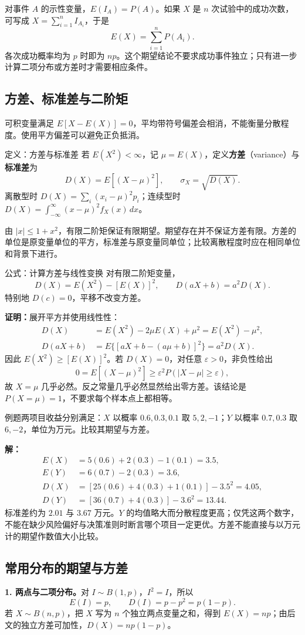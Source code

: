 \documentclass[UTF8,fontset=none,zihao=-4,a4paper]{ctexart}
\newcommand{\term}[1]{\textbf{#1}}
\newcommand{\example}[1]{\begin{infobox}{例题}#1\end{infobox}}
\newcommand{\solution}{\par\noindent\textbf{解：}}
\newcommand{\proof}{\par\noindent\textbf{证明：}}
\begin{document}
对事件 $A$ 的示性变量，$E(I_A)=P(A)$。如果 $X$ 是 $n$ 次试验中的成功次数，可写成 $X=\sum_{i=1}^n I_{A_i}$，于是
\[
E(X)=\sum_{i=1}^n P(A_i).
\]
各次成功概率均为 $p$ 时即为 $np$。这个期望结论不要求成功事件独立；只有进一步计算二项分布或方差时才需要相应条件。

\subsection{方差、标准差与二阶矩}
可积变量满足 $E[X-E(X)]=0$，平均带符号偏差会相消，不能衡量分散程度。使用平方偏差可以避免正负抵消。
\begin{infobox}{定义：方差与标准差}
若 $E(X^2)<\infty$，记 $\mu=E(X)$，定义\term{方差}（variance）与\term{标准差}为
\[
D(X)=E[(X-\mu)^2],\qquad \sigma_X=\sqrt{D(X)}.
\]
离散型时 $D(X)=\sum_i(x_i-\mu)^2p_i$；连续型时
$D(X)=\int_{-\infty}^{\infty}(x-\mu)^2f_X(x)\,dx$。
\end{infobox}
由 $|x|\le1+x^2$，有限二阶矩保证有限期望。期望存在并不保证方差有限。方差的单位是原变量单位的平方，标准差与原变量同单位；比较离散程度时应在相同单位和背景下进行。
\begin{infobox}{公式：计算方差与线性变换}
对有限二阶矩变量，
\[
D(X)=E(X^2)-[E(X)]^2,\qquad D(aX+b)=a^2D(X).
\]
特别地 $D(c)=0$，平移不改变方差。
\end{infobox}
\proof 展开平方并使用线性性：
\begin{align*}
D(X)&=E(X^2)-2\mu E(X)+\mu^2=E(X^2)-\mu^2,\\
D(aX+b)&=E\{[aX+b-(a\mu+b)]^2\}=a^2D(X).
\end{align*}
因此 $E(X^2)\ge[E(X)]^2$。若 $D(X)=0$，对任意 $\varepsilon>0$，非负性给出
\[
0=E[(X-\mu)^2]\ge\varepsilon^2P(|X-\mu|\ge\varepsilon),
\]
故 $X=\mu$ 几乎必然。反之常量几乎必然显然给出零方差。该结论是 $P(X=\mu)=1$，不要求每个样本点上都相等。
\example{两项目收益分别满足：$X$ 以概率 $0.6,0.3,0.1$ 取 $5,2,-1$；$Y$ 以概率 $0.7,0.3$ 取 $6,-2$，单位为万元。比较其期望与方差。}
\solution
\begin{align*}
E(X)&=5(0.6)+2(0.3)-1(0.1)=3.5,\\
E(Y)&=6(0.7)-2(0.3)=3.6,\\
D(X)&=[25(0.6)+4(0.3)+1(0.1)]-3.5^2=4.05,\\
D(Y)&=[36(0.7)+4(0.3)]-3.6^2=13.44.
\end{align*}
标准差约为 $2.01$ 与 $3.67$ 万元。$Y$ 的均值略大而分散程度更高；仅凭这两个数字，不能在缺少风险偏好与决策准则时断言哪个项目一定更优。方差不能直接与以万元计的期望作数值大小比较。

\subsection{常用分布的期望与方差}
\textbf{1. 两点与二项分布。}对 $I\sim B(1,p)$，$I^2=I$，所以
\[
E(I)=p,\qquad D(I)=p-p^2=p(1-p).
\]
若 $X\sim B(n,p)$，把 $X$ 写为 $n$ 个独立两点变量之和，得到 $E(X)=np$；由后文的独立方差可加性，$D(X)=np(1-p)$。
\end{document}
